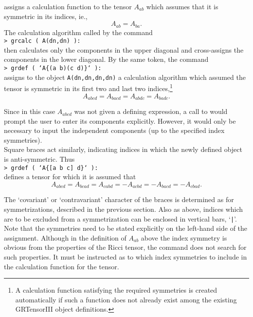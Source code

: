 \documentclass{article}
\begin{document}
\noindent assigns a calculation function to the tensor
$A_{ab}$ which assumes that it is symmetric in its indices, ie.,
\[
  A_{ab} = A_{ba}.
\]
The calculation algorithm called by the command \\

\noindent\texttt{> grcalc ( A(dn,dn) ):}\\

\noindent then calculates only the components in the upper diagonal
and cross-assigns the components in the lower diagonal. By the same
token, the command\\

\noindent\texttt{> grdef ( `A\{(a b)(c d)\}` ):}\\

\noindent assigns to the object \texttt{A(dn,dn,dn,dn)} a calculation
algorithm which assumed the tensor is symmetric in its first two and
last two indices,\footnote{A calculation function satisfying the
required symmetries is created automatically if such a function does
not already exist among the existing GRTensorIII object definitions.}
\[
  A_{abcd} = A_{bacd} = A_{abdc} = A_{badc}.
\]

\indent Since in this case $A_{abcd}$ was not given a defining
expression, a call to  would prompt the user to enter
its components explicitly. However, it would only be necessary to
input the independent components (up to the specified index
symmetries).\\

Square braces act similarly, indicating indices in which the newly
defined object is anti-symmetric. Thus\\

\noindent\texttt{> grdef ( `A\{[a b c] d\}` ): }\\

\noindent defines a tensor for which it is assumed that
\[
  A_{abcd} = A_{bcad} = A_{cabd} = -A_{acbd} = -A_{bacd} = -A_{cbad}.
\]

The `covariant' or `contravariant' character of the braces is
determined as for symmetrizations, described in the previous
section. Also as above, indices which are to be excluded from a
symmetrization can be enclosed in vertical bars, `\texttt{|}'.\\

Note that the symmetries need to be stated explicitly on the left-hand
side of the assignment. Although in the definition of $A_{ab}$ above
the index symmetry is obvious from the properties of the Ricci tensor,
the  command does not search for such properties. It must
be instructed as to which index symmetries to include in the
calculation function for the tensor.
\end{document}
